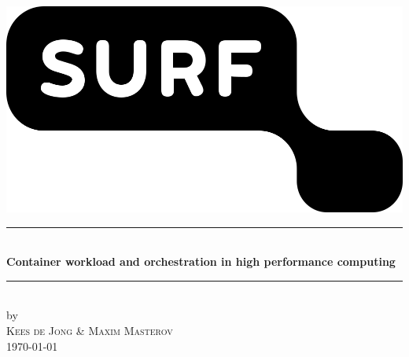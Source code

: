 \documentclass[12pt]{article}
\begin{document}
\begin{titlepage}

\newcommand{\HRule}{\rule{\linewidth}{0.5mm}}

\begin{center}
\includegraphics[width=\linewidth/3]{images/surf.png}

\HRule \\[0.4cm]
{\huge \bfseries Container workload and orchestration in high performance computing}\\[0.4cm]
\HRule \\[0.5cm]
 
by\\[0.2cm]
\textsc{\Large Kees de Jong \& Maxim Masterov}\\[0.2cm]

{\Large \today}\\[1cm]

\vfill

\end{center}
\end{titlepage}

\tableofcontents
\newpage



\end{document}
